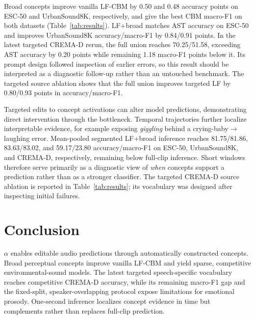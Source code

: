 \documentclass[runningheads]{llncs}
\newcommand{\method}{\ensuremath{\alpha}\text{-CBM}}
\begin{document}
Broad concepts improve vanilla LF-CBM by 0.50 and 0.48 accuracy points on ESC-50 and UrbanSound8K, respectively, and give the best CBM macro-F1 on both datasets (Table~\ref{tab:results}). LF+broad matches AST accuracy on ESC-50 and improves UrbanSound8K accuracy/macro-F1 by 0.84/0.91 points. In the latest targeted CREMA-D rerun, the full union reaches 70.25/51.58, exceeding AST accuracy by 0.20 points while remaining 1.18 macro-F1 points below it. Its prompt design followed inspection of earlier errors, so this result should be interpreted as a diagnostic follow-up rather than an untouched benchmark. The targeted source ablation shows that the full union improves targeted LF by 0.80/0.93 points in accuracy/macro-F1.

Targeted edits to concept activations can alter model predictions, demonstrating direct intervention through the bottleneck. Temporal trajectories further localize interpretable evidence, for example exposing \emph{giggling} behind a crying-baby$\rightarrow$laughing error. Mean-pooled segmented LF+broad inference reaches 81.75/81.86, 83.63/83.02, and 59.17/23.80 accuracy/macro-F1 on ESC-50, UrbanSound8K, and CREMA-D, respectively, remaining below full-clip inference. Short windows therefore serve primarily as a diagnostic view of \emph{when} concepts support a prediction rather than as a stronger classifier. The targeted CREMA-D source ablation is reported in Table~\ref{tab:results}; its vocabulary was designed after inspecting initial failures.


\section{Conclusion}
\method{} enables editable audio predictions through automatically constructed concepts. Broad perceptual concepts improve vanilla LF-CBM and yield sparse, competitive environmental-sound models. The latest targeted speech-specific vocabulary reaches competitive CREMA-D accuracy, while its remaining macro-F1 gap and the fixed-split, speaker-overlapping protocol expose limitations for emotional prosody. One-second inference localizes concept evidence in time but complements rather than replaces full-clip prediction.



\end{document}
